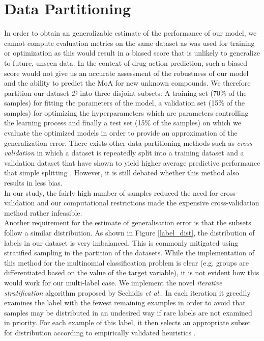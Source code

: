 \documentclass[bsc,frontabs,twoside,singlespacing,parskip,deptreport]{infthesis}     %
\let\Oldsection\section
\renewcommand{\section}{\FloatBarrier\Oldsection}
\begin{document}
\section{Data Partitioning}
In order to obtain an generalizable estimate of the performance of our model, we cannot compute evaluation metrics on the same dataset as was used for training or optimization as this would result in a biased score that is unlikely to generalize to future, unseen data. In the context of drug action prediction, such a biased score would not give us an accurate assessment of the robustness of our model and the ability to predict the MoA for new unknown compounds. 
We therefore partition our dataset \(\mathscr{D}\) into three disjoint subsets: A training set (70\% of the samples) for fitting the parameters of the model, a validation set (15\% of the samples) for optimizing the hyperparameters which are parameters controlling the learning process and finally a test set (15\% of the samples) on which we evaluate the optimized models in order to provide an approximation of the generalization error.
There exists other data partitioning methods such as \textit{cross-validation} in which a dataset is repeatedly split into a training dataset and a validation dataset that have shown to yield higher average predictive performance that simple splitting \cite{schaffer_selecting_1993}. However, it is still debated whether this method also results in less bias. \\
In our study, the fairly high number of samples reduced the need for cross-validation and our computational restrictions made the expensive cross-validation method rather infeasible. \\
Another requirement for the estimate of generalisation error is that the subsets follow a similar distribution. As shown in Figure \ref{label_dist}, the distribution of labels in our dataset is very imbalanced. This is commonly mitigated using stratified sampling in the partition of the datasets. While the implementation of this method for the multinomial classification problem is clear (e.g. groups are differentiated based on the value of the target variable), it is not evident how this would work for our multi-label case. We implement the novel \textit{iterative stratification} algorithm proposed by Sechidis \textit{et al.}. In each iteration it greedily examines the label with the fewest remaining examples in order to avoid that samples may be distributed in an undesired way if rare labels are not examined in priority. For each example of this label, it then selects an appropriate subset for distribution according to empirically validated heuristics \cite{sechidis_stratication_nodate}.
\end{document}
